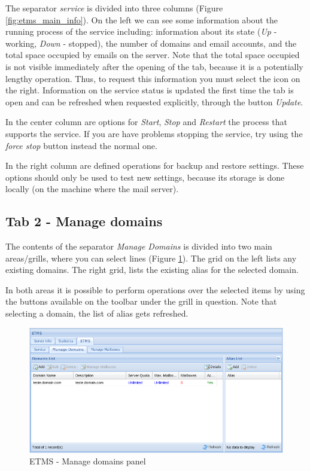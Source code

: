 The separator \textit{service} is divided into three columns (Figure \ref{fig:etms_main_info}). 
On the left we can see some information about the running process of the service including: information about its state (\textit{Up} - working, \textit{Down} - stopped), the number of domains and email accounts, and the total space occupied by emails on the server. 
Note that the total space occupied is not visible immediately after the opening of the tab, because it is a potentially lengthy operation. 
Thus, to request this information you must select the icon on the right. 
Information on the service status is updated the first time the tab is open and can be refreshed when requested explicitly, through the button \textit{Update}.

In the center column are options for \textit{Start}, \textit{Stop} and \textit{Restart} the process that supports the service. If you are have problems stopping the service, try using the \textit{force stop} button instead the normal one.

In the right column are defined operations for backup and restore settings. These options should only be used to test new settings, because its storage is done locally (on the machine where the mail server).

\subsection{Tab 2 - Manage domains}
\label{sec:etms_gerir_dominios}

The contents of the separator \textit{Manage Domains} is divided into two main areas/grills, where you can select lines (Figure \ref{fig:etms_criar_dominio_1}). The grid on the left lists any existing domains. The right grid, lists the existing alias for the selected domain.

In both areas it is possible to perform operations over the selected items by using the buttons available on the toolbar under the grill in question. Note that selecting a domain, the list of alias gets refreshed.

\begin{figure}[H]
    \begin{center}
    \includegraphics[scale=0.45]{screenshots/etms/etms_criar_dominio_1.png}
    \caption{ETMS - Manage domains panel}
    \label{fig:etms_criar_dominio_1}
    \end{center}
\end{figure}


